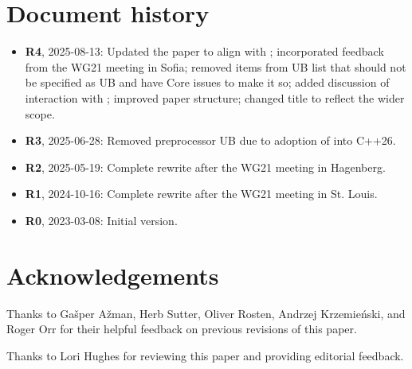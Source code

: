 \section*{Document history}
\begin{itemize}
\item \textbf{R4}, 2025-08-13: Updated the paper to align with \cite{P3754R0}; incorporated feedback from the WG21 meeting in Sofia; removed items from UB list that should not be specified as UB and have Core issues to make it so; added discussion of interaction with ; improved paper structure; changed title to reflect the wider scope.
\item \textbf{R3}, 2025-06-28: Removed preprocessor UB due to adoption of \cite{P2843R3} into C++26.
\item \textbf{R2}, 2025-05-19: Complete rewrite after the WG21 meeting in Hagenberg.
\item \textbf{R1}, 2024-10-16: Complete rewrite after the WG21 meeting in St. Louis.
\item \textbf{R0}, 2023-03-08: Initial version.
\end{itemize}

\section*{Acknowledgements}

Thanks to Ga\v{s}per A\v{z}man, Herb Sutter, Oliver Rosten, Andrzej Krzemie{\'n}ski, and Roger Orr for their helpful feedback on previous revisions of this paper.

Thanks to Lori Hughes for reviewing this paper and providing editorial feedback. 


\renewcommand{\addcontentsline}[3]{}%







